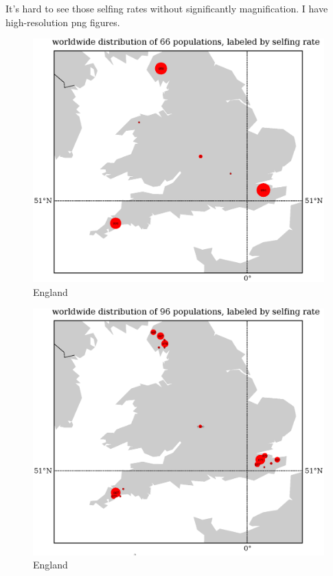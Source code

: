 \documentclass[a4paper,10pt]{article}
\begin{document}
It's hard to see those selfing rates without significantly magnification. I have high-resolution png figures.

\begin{figure}
\includegraphics[width=1\textwidth]{figures/s0829popid2ecotypeid_25_Eng__7_49_2_55_l3y1_pop_map.eps}
\caption{England}\label{f12}
\end{figure}

\begin{figure}
\includegraphics[width=1\textwidth]{figures/s0829popid2ecotypeid_10_Eng__7_49_2_55_l3y1_pop_map.eps}
\caption{England}\label{f11}
\end{figure}
\end{document}
